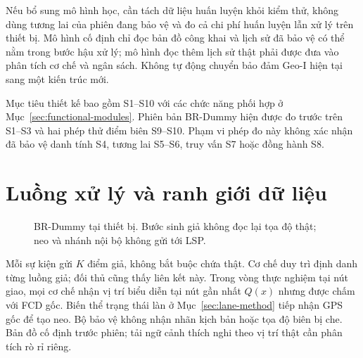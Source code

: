 Nếu bổ sung mô hình học, cần tách dữ liệu huấn luyện khỏi kiểm thử, không dùng tương lai của phiên đang bảo vệ và đo cả chi phí huấn luyện lẫn xử lý trên thiết bị. Mô hình cố định chỉ đọc bản đồ công khai và lịch sử đã bảo vệ có thể nằm trong bước hậu xử lý; mô hình đọc thêm lịch sử thật phải được đưa vào phân tích cơ chế và ngân sách. Không tự động chuyển bảo đảm Geo-I hiện tại sang một kiến trúc mới.

Mục tiêu thiết kế bao gồm S1--S10 với các chức năng phối hợp ở Mục~\ref{sec:functional-modules}. Phiên bản BR-Dummy hiện được đo trước trên S1--S3 và hai phép thử điểm biên S9--S10. Phạm vi phép đo này không xác nhận đã bảo vệ danh tính S4, tương lai S5--S6, truy vấn S7 hoặc đồng hành S8.

\section{Luồng xử lý và ranh giới dữ liệu}

\begin{figure}[htbp]\centering
{}
\caption{BR-Dummy tại thiết bị. Bước sinh giả không đọc lại tọa độ thật; neo và nhánh nội bộ không gửi tới LSP.}
\end{figure}

Mỗi sự kiện gửi $K$ điểm giả, không bắt buộc chứa thật. Cơ chế duy trì định danh từng luồng giả; đối thủ cũng thấy liên kết này. Trong vòng thực nghiệm tại nút giao, mọi cơ chế nhận vị trí biểu diễn tại nút gần nhất $Q(x)$ nhưng được chấm với FCD gốc. Biến thể trạng thái làn ở Mục~\ref{sec:lane-method} tiếp nhận GPS gốc để tạo neo. Bộ bảo vệ không nhận nhãn kịch bản hoặc tọa độ biên bị che. Bản đồ cố định trước phiên; tải ngữ cảnh thích nghi theo vị trí thật cần phân tích rò rỉ riêng.

